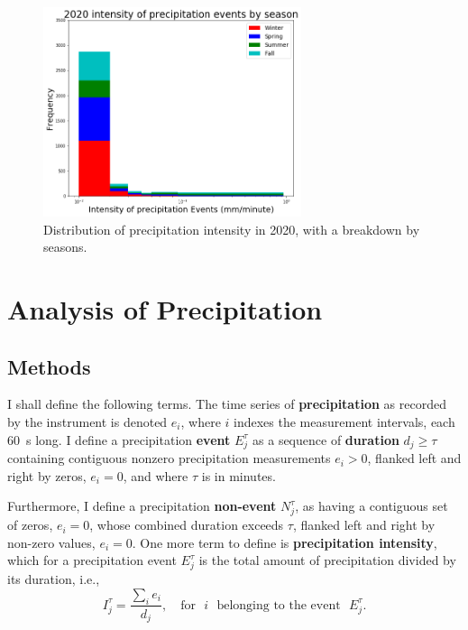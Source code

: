 \documentclass[11pt]{report}
\newcommand{\fracd}[2]{\frac{\displaystyle{#1}}{\displaystyle{#2}}}
\begin{document}
\begin{figure}[b]
	\centering
	\includegraphics[width=0.675\textwidth]{Figures/inten2020.png}
	\caption[Intensity histogram for 2020 broken down by season]
	{\label{i2020} Distribution of precipitation intensity in
		2020, with a breakdown by seasons.}
\end{figure}
\clearpage

\section{Analysis of Precipitation}\label{sec:apc}


\subsection{Methods}\label{sec:methods}

I shall define the following terms. The time series of
\textbf{precipitation} as recorded by the instrument is denoted $e_i$, where
$i$ indexes the measurement intervals, each 60~s long. I define a
precipitation \textbf{event} $E_j^\tau $ as a sequence of \textbf{duration}
$d_j\ge \tau$ containing contiguous nonzero precipitation measurements
$e_i>0$, flanked left and right by zeros, $e_i=0$, and where $\tau$ is in
minutes.

Furthermore, I define a precipitation \textbf{non-event} $N_j^\tau$, as
having a contiguous set of zeros, $e_i=0$, whose combined duration exceeds
$\tau$, flanked left and right by non-zero values, $e_i=0$.
One more term to define is \textbf{precipitation intensity}, which for a
precipitation event $E_j^\tau$ is the total amount of precipitation divided
by its duration, i.e.,
\begin{equation}
I_j^\tau = \fracd{\sum_i e_i }{d_j} ,
\quad
\mbox{for}\,\,\,\, i\,\,\,\, \mbox{belonging to the event}\,\,\,\, E_j^\tau
.
\end{equation}
\end{document}
